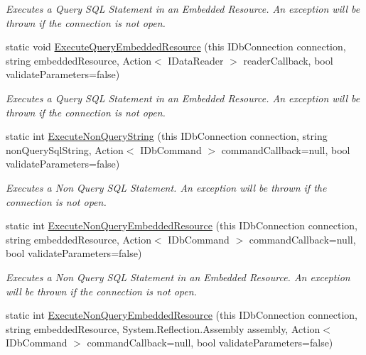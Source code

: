 \begin{DoxyCompactItemize}
\begin{DoxyCompactList}\small\item\em Executes a Query S\+QL Statement in an Embedded Resource. An exception will be thrown if the connection is not open. \end{DoxyCompactList}\item 
static void \mbox{\hyperlink{class_blue_cloud_1_1_extensions_1_1_data_1_1_i_db_connection_extensions_a8d29f18027a4b5f1bba7d2dbf5a2ea6c}{Execute\+Query\+Embedded\+Resource}} (this I\+Db\+Connection connection, string embedded\+Resource, Action$<$ I\+Data\+Reader $>$ reader\+Callback, bool validate\+Parameters=false)
\begin{DoxyCompactList}\small\item\em Executes a Query S\+QL Statement in an Embedded Resource. An exception will be thrown if the connection is not open. \end{DoxyCompactList}\item 
static int \mbox{\hyperlink{class_blue_cloud_1_1_extensions_1_1_data_1_1_i_db_connection_extensions_adfac9ac363eeb9545af9b3a662f438df}{Execute\+Non\+Query\+String}} (this I\+Db\+Connection connection, string non\+Query\+Sql\+String, Action$<$ I\+Db\+Command $>$ command\+Callback=null, bool validate\+Parameters=false)
\begin{DoxyCompactList}\small\item\em Executes a Non Query S\+QL Statement. An exception will be thrown if the connection is not open. \end{DoxyCompactList}\item 
static int \mbox{\hyperlink{class_blue_cloud_1_1_extensions_1_1_data_1_1_i_db_connection_extensions_af48b91dbba9d032dbd364a0ce48a7238}{Execute\+Non\+Query\+Embedded\+Resource}} (this I\+Db\+Connection connection, string embedded\+Resource, Action$<$ I\+Db\+Command $>$ command\+Callback=null, bool validate\+Parameters=false)
\begin{DoxyCompactList}\small\item\em Executes a Non Query S\+QL Statement in an Embedded Resource. An exception will be thrown if the connection is not open. \end{DoxyCompactList}\item 
static int \mbox{\hyperlink{class_blue_cloud_1_1_extensions_1_1_data_1_1_i_db_connection_extensions_a3dcbcb9d09dd691c17bc9652fa2894b1}{Execute\+Non\+Query\+Embedded\+Resource}} (this I\+Db\+Connection connection, string embedded\+Resource, System.\+Reflection.\+Assembly assembly, Action$<$ I\+Db\+Command $>$ command\+Callback=null, bool validate\+Parameters=false)

\end{DoxyCompactItemize}
